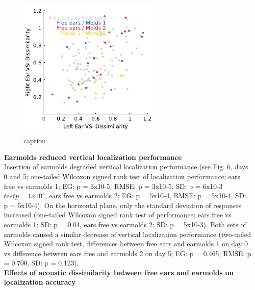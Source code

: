 \begin{figure}[ht]
 	\includegraphics[width=7cm, left]{../Results/figures/fig5/fig5}
	\caption{caption}
        \label{fig:first}
\end{figure}

\noindent \textbf{Earmolds reduced vertical localization performance}\\

Insertion of earmolds degraded vertical localization performance (see Fig. 6, days 0 and 5; one-tailed Wilcoxon signed rank test of localization performance; ears free vs earmolds 1; EG: p = 3x10-5, RMSE: p = 3x10-5, SD: p = 6x10-3 $testp =1x10^{5}$, ears free vs earmolds 2; EG: p = 5x10-4, RMSE: p = 5x10-4, SD: p = 5x10-4). On the horizontal plane, only the standard deviation of responses increased (one-tailed Wilcoxon signed rank test of performance; ears free vs earmolds 1; SD: p = 0.04, ears free vs earmolds 2: SD: p = 5x10-3). Both sets of earmolds caused a similar decrease of vertical localization performance (two-tailed Wilcoxon signed rank test, differences between free ears and earmolds 1 on day 0 vs difference between ears free and earmolds 2 on day 5; EG: p = 0.465, RMSE: p = 0.700, SD: p = 0.123).\\ %
  
 \noindent\textbf{Effects of acoustic dissimilarity between free ears and earmolds on localization accuracy}\\

